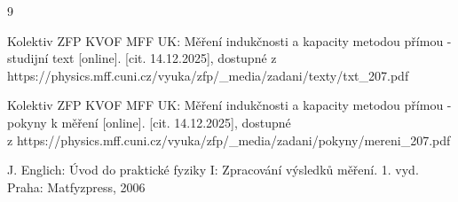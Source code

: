 \documentclass{../concepts/prepareprotokol} %
\begin{document}
\begin{thebibliography}{9}

 Kolektiv ZFP KVOF MFF UK: Měření indukčnosti a kapacity metodou přímou - studijní text [online]. [cit. 14.12.2025], dostupné z https://physics.mff.cuni.cz/vyuka/zfp/\_media/zadani/texty/txt\_207.pdf

 Kolektiv ZFP KVOF MFF UK: Měření indukčnosti a kapacity metodou přímou - pokyny k měření [online]. [cit. 14.12.2025], dostupné \\
z https://physics.mff.cuni.cz/vyuka/zfp/\_media/zadani/pokyny/mereni\_207.pdf

 J. Englich: Úvod do praktické fyziky I: Zpracování výsledků měření. 1. vyd. Praha: Matfyzpress, 2006

\end{thebibliography}
\end{document}
